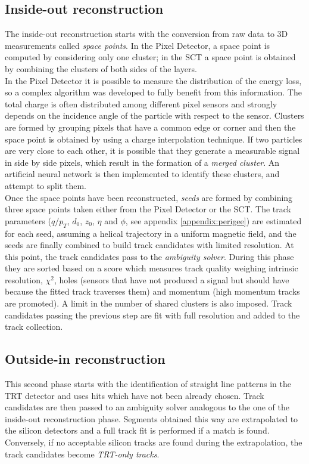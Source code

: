 \documentclass[a4paper,twoside,12pt]{book}
\begin{document}
\subsection*{Inside-out reconstruction}
The inside-out reconstruction starts with the conversion from raw data to 3D measurements called \textit{space points}. In the Pixel Detector, a space point is computed by
considering only one cluster; in the SCT a space point
is obtained by combining the clusters of both sides of the layers.  \\

In the Pixel Detector it is
possible to measure the distribution of the energy loss, so a complex algorithm was developed
to fully benefit from this information.  
The total charge is often distributed among different pixel sensors and strongly depends on the 
incidence angle of the particle with respect to the sensor. Clusters are formed by grouping 
pixels that have a common edge or corner and then the space point is obtained by using a 
charge interpolation technique. If two particles are very close to each other, it is possible
that they generate a measurable signal in side by side pixels, which result in the formation of
a \textit{merged cluster}. An artificial neural network is then implemented to identify these clusters, and attempt to split them.\\

Once the space points have been reconstructed, \textit{seeds} are formed by combining three space points taken either from the Pixel Detector or the SCT. The track parameters ($q/p_{T}$, $d_{0}$, $z_{0}$, $\eta$ and $\phi$, see appendix \ref{appendix:perigee}) are estimated for each seed, assuming a helical trajectory in a 
uniform magnetic field, and the seeds are finally combined to build track candidates with limited resolution. At this point, the track candidates pass to the \textit{ambiguity solver}. During this
phase they are sorted based on a score which measures track quality
weighing intrinsic resolution, $\chi^2$, holes (sensors that have not produced a signal but 
should have because the fitted track traverses them) and momentum (high momentum tracks are 
promoted). A limit in the number of shared clusters is also imposed. Track candidates passing the previous step are fit with full resolution and added to the track collection.

\subsection*{Outside-in reconstruction}
This second phase starts with the identification of straight line patterns in the TRT detector
and uses hits which have not been already chosen. Track candidates are then passed to an ambiguity solver analogous to the one of the inside-out reconstruction phase. Segments obtained this way are extrapolated to the silicon detectors and a full track fit is performed if a match is found. Conversely, if no acceptable silicon tracks are found during 
the extrapolation, the track candidates become \textit{TRT-only tracks}. \\
\end{document}
